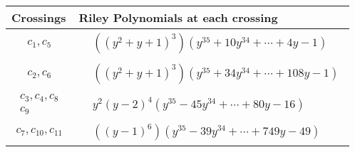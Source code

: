 \documentclass[1p]{elsarticle_modified}
\theoremstyle{definition}
\begin{document}
\begin{tabular}{m{50pt}|m{274pt}}
Crossings & \hspace{64pt}Riley Polynomials at each crossing \\
\hline $$\begin{aligned}c_{1},c_{5}\end{aligned}$$&$\begin{aligned}
&((y^2+y+1)^3)(y^{35}+10 y^{34}+\cdots+4 y-1)
\end{aligned}$\\
\hline $$\begin{aligned}c_{2},c_{6}\end{aligned}$$&$\begin{aligned}
&((y^2+y+1)^3)(y^{35}+34 y^{34}+\cdots+108 y-1)
\end{aligned}$\\
\hline $$\begin{aligned}c_{3},c_{4},c_{8}\\c_{9}\end{aligned}$$&$\begin{aligned}
&y^2(y-2)^4(y^{35}-45 y^{34}+\cdots+80 y-16)
\end{aligned}$\\
\hline $$\begin{aligned}c_{7},c_{10},c_{11}\end{aligned}$$&$\begin{aligned}
&((y-1)^6)(y^{35}-39 y^{34}+\cdots+749 y-49)
\end{aligned}$\\
\hline
\end{tabular}
\vskip 2pc
\end{document}

